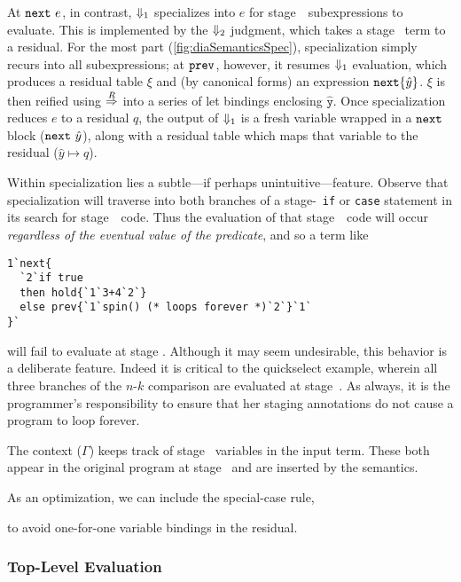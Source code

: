 
At ${\tt next}~e$, in contrast, ${\Downarrow_{ 1}}$ specializes into $e$ for stage~\bbone\ 
subexpressions to evaluate.  This is implemented by the ${\Downarrow_{ 2}}$ judgment,
which takes a stage \bbtwo\ term to a residual. 
For the most part (\ref{fig:diaSemanticsSpec}), specialization simply recurs into
all subexpressions; at ${\tt prev}$, however, it resumes ${\Downarrow_{ 1}}$ evaluation,
which produces a residual table $\xi$ and (by canonical forms) an expression
${\tt next}\{\hat y\}$. $\xi$ is then reified using $\overset{R}\Rightarrow$ into a series of let
bindings enclosing $\mathtt{\hat y}$.
Once specialization reduces $e$ to a residual $q$, the output of ${\Downarrow_{ 1}}$ is a
fresh variable wrapped in a ${\tt next}$ block (${\tt next}~\hat y$), along with a residual
table which maps that variable to the residual ($\hat y \mapsto q$).

Within specialization lies a subtle---if perhaps unintuitive---feature.  
Observe that specialization will traverse into both branches of a stage-\bbtwo\ {\tt if} or {\tt case} 
statement in its search for stage~\bbone\ code. 
Thus the evaluation of that stage~\bbone\ code will occur {\em regardless of the eventual value of the predicate},
and so a term like 
\begin{lstlisting} 
1`next{
  `2`if true 
  then hold{`1`3+4`2`} 
  else prev{`1`spin() (* loops forever *)`2`}`1`
}`
\end{lstlisting}
will fail to evaluate at stage \bbone.
Although it may seem undesirable, this behavior is a deliberate feature.
Indeed it is critical to the quickselect example, 
wherein all three branches of the $n$-$k$ comparison are evaluated at stage~\bbone.
As always, it is the programmer's responsibility to ensure that her staging annotations 
do not cause a program to loop forever.  

The context ($\Gamma$) keeps track of stage \bbtwo\ variables in the input term. 
These both appear in the original program at stage \bbtwo\ and are inserted by the semantics.

As an optimization, we can include the special-case rule,
\begin{mathpar}
\end{mathpar}
to avoid one-for-one variable bindings in the residual.

\subsubsection {Top-Level Evaluation}
\label{sec:partialeval}

